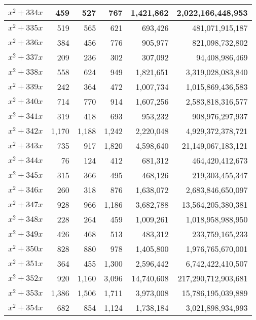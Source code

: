 \documentclass[a4paper]{amsproc}
\theoremstyle{plain}
\theoremstyle{named}
\begin{document}
\begin{longtable}{ | l | r | r | r | r | r | }
$x^2 + 334x$ & 459 & 527 & 767 & 1{,}421{,}862 & 2{,}022{,}166{,}448{,}953 \\ \hline
$x^2 + 335x$ & 519 & 565 & 621 & 693{,}426 & 481{,}071{,}915{,}187 \\ \hline
$x^2 + 336x$ & 384 & 456 & 776 & 905{,}977 & 821{,}098{,}732{,}802 \\ \hline
$x^2 + 337x$ & 209 & 236 & 302 & 307{,}092 & 94{,}408{,}986{,}469 \\ \hline
$x^2 + 338x$ & 558 & 624 & 949 & 1{,}821{,}651 & 3{,}319{,}028{,}083{,}840 \\ \hline
$x^2 + 339x$ & 242 & 364 & 472 & 1{,}007{,}734 & 1{,}015{,}869{,}436{,}583 \\ \hline
$x^2 + 340x$ & 714 & 770 & 914 & 1{,}607{,}256 & 2{,}583{,}818{,}316{,}577 \\ \hline
$x^2 + 341x$ & 319 & 418 & 693 & 953{,}232 & 908{,}976{,}297{,}937 \\ \hline
$x^2 + 342x$ & 1{,}170 & 1{,}188 & 1{,}242 & 2{,}220{,}048 & 4{,}929{,}372{,}378{,}721 \\ \hline
$x^2 + 343x$ & 735 & 917 & 1{,}820 & 4{,}598{,}640 & 21{,}149{,}067{,}183{,}121 \\ \hline
$x^2 + 344x$ & 76 & 124 & 412 & 681{,}312 & 464{,}420{,}412{,}673 \\ \hline
$x^2 + 345x$ & 315 & 366 & 495 & 468{,}126 & 219{,}303{,}455{,}347 \\ \hline
$x^2 + 346x$ & 260 & 318 & 876 & 1{,}638{,}072 & 2{,}683{,}846{,}650{,}097 \\ \hline
$x^2 + 347x$ & 928 & 966 & 1{,}186 & 3{,}682{,}788 & 13{,}564{,}205{,}380{,}381 \\ \hline
$x^2 + 348x$ & 228 & 264 & 459 & 1{,}009{,}261 & 1{,}018{,}958{,}988{,}950 \\ \hline
$x^2 + 349x$ & 426 & 468 & 513 & 483{,}312 & 233{,}759{,}165{,}233 \\ \hline
$x^2 + 350x$ & 828 & 880 & 978 & 1{,}405{,}800 & 1{,}976{,}765{,}670{,}001 \\ \hline
$x^2 + 351x$ & 364 & 455 & 1{,}300 & 2{,}596{,}442 & 6{,}742{,}422{,}410{,}507 \\ \hline
$x^2 + 352x$ & 920 & 1{,}160 & 3{,}096 & 14{,}740{,}608 & 217{,}290{,}712{,}903{,}681 \\ \hline
$x^2 + 353x$ & 1{,}386 & 1{,}506 & 1{,}711 & 3{,}973{,}008 & 15{,}786{,}195{,}039{,}889 \\ \hline
$x^2 + 354x$ & 682 & 854 & 1{,}124 & 1{,}738{,}184 & 3{,}021{,}898{,}934{,}993 \\ \hline

\end{longtable}
\end{document}
